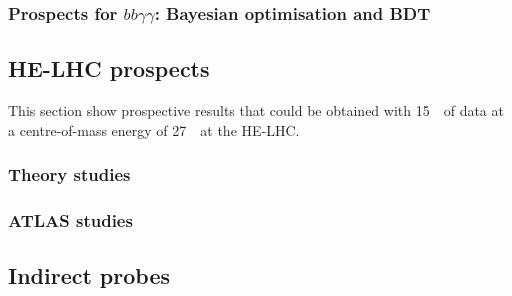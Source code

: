 \documentclass[../report.tex]{subfiles}
\providecommand{\main}{..}
\begin{document}

\subsubsection{Prospects for $bb\gamma\gamma $: Bayesian optimisation and BDT}












\subsection{HE-LHC prospects}
\label{sec:HH_HE}

This section show prospective results that could be obtained with 15~\abinv\ of data at a centre-of-mass energy of 27~\TeV\ at the HE-LHC.

\subsubsection{Theory studies}


\subsubsection{ATLAS studies}




\subsection{Indirect probes}
\label{sec:HH_indirect}
\end{document}
